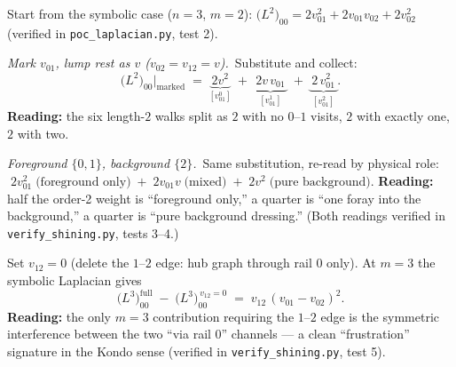 \documentclass[11pt,a4paper]{article}
\begin{document}
\begin{examplebox}[title={Example (3$'$)\;\;Channel sensitivity \& sub-rail focus at $n{=}3$, $m{=}2$}]
Start from the symbolic case ($n{=}3$, $m{=}2$):
$\big(L^{2}\big)_{00} = 2v_{01}^{2} + 2v_{01}v_{02} + 2v_{02}^{2}$
(verified in \texttt{poc\_laplacian.py}, test 2).

\smallskip
\textit{Mark $v_{01}$, lump rest as $v$ ($v_{02}{=}v_{12}{=}v$).}\,
Substitute and collect:
\[
\big(L^{2}\big)_{00}\big|_{\text{marked}}
\;=\; \underbrace{\,2v^{2}\,}_{[v_{01}^{0}]}
\;+\; \underbrace{\,2v\,v_{01}\,}_{[v_{01}^{1}]}
\;+\; \underbrace{\,2\,v_{01}^{2}\,}_{[v_{01}^{2}]}.
\]
\textbf{Reading:} the six length-$2$ walks split as $2$ with no
$0$--$1$ visits, $2$ with exactly one, $2$ with two.

\smallskip
\textit{Foreground $\{0,1\}$, background $\{2\}$.}\, Same substitution,
re-read by physical role:
$\;2v_{01}^{2}\;\text{(foreground only)} \;+\; 2v_{01}v\;\text{(mixed)} \;+\;
2v^{2}\;\text{(pure background)}.$
\textbf{Reading:} half the order-2 weight is ``foreground only,'' a
quarter is ``one foray into the background,'' a quarter is ``pure
background dressing.''
(Both readings verified in \texttt{verify\_shining.py}, tests 3--4.)
\end{examplebox}

\begin{examplebox}[title={Example (3$''$)\;\;Forbidden patterns (F-S \S\,VII.8.1) at $n{=}3$, $m{=}3$}]
Set $v_{12}{=}0$ (delete the $1$--$2$ edge: hub graph through rail $0$
only). At $m{=}3$ the symbolic Laplacian gives
\[
\big(L^{3}\big)_{00}^{\text{full}}
\;-\;
\big(L^{3}\big)_{00}^{\,v_{12}=0}
\;=\;
v_{12}\,(v_{01}-v_{02})^{2}.
\]
\textbf{Reading:} the only $m{=}3$ contribution requiring the $1$--$2$
edge is the symmetric interference between the two
``via rail $0$'' channels --- a clean ``frustration'' signature in the
Kondo sense (verified in \texttt{verify\_shining.py}, test 5).
\end{examplebox}
\end{document}
